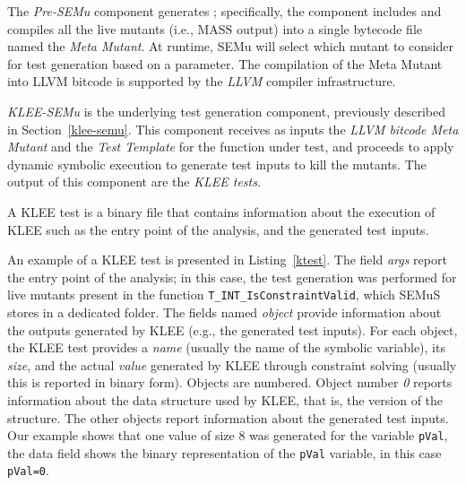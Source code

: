 The \emph{Pre-SEMu} component generates ; specifically, the component includes and compiles all the live mutants (i.e., MASS output) into a single bytecode file named the \emph{Meta Mutant}. At runtime, SEMu will select which mutant to consider for test generation based on a parameter. The compilation of the Meta Mutant into LLVM bitcode is supported by the \emph{LLVM} compiler infrastructure. 




\emph{KLEE-SEMu} is the underlying test generation component, previously described in Section~\ref{klee-semu}. This component receives as inputs the \emph{LLVM bitcode Meta Mutant} and the \emph{Test Template} for the function under test, and proceeds to apply dynamic symbolic execution to generate test inputs to kill the mutants. The output of this component are the \emph{KLEE tests}.

A KLEE test is a binary file that contains information about the execution of KLEE such as the entry point of the analysis, and the generated test inputs.


An example of a KLEE test is presented in Listing~\ref{ktest}. The field \emph{args} report the entry point of the analysis; in this case, the test generation was performed for live mutants present in the function \texttt{T\_INT\_IsConstraintValid}, which SEMuS stores in a dedicated folder. The fields named \emph{object} provide information about the outputs generated by KLEE (e.g., the generated test inputs). 
For each object, the KLEE test provides a \emph{name} (usually the name of the symbolic variable), its \emph{size}, and the actual \emph{value} generated by KLEE through constraint solving (usually this is reported in binary form).
Objects are numbered. Object number \emph{0} reports information about the data structure used by KLEE, that is, the version of the structure. The other objects report information about the generated test inputs.
Our example shows that one value of size 8 was generated for the variable \texttt{pVal}, the data field shows the binary representation of the \texttt{pVal} variable, in this case \texttt{pVal=0}.






